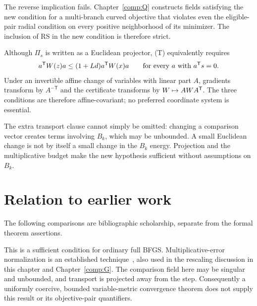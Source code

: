 The reverse implication fails. Chapter~\ref{comp:Q} constructs fields satisfying the new condition for a multi-branch curved objective that violates even the eligible-pair radial condition on every positive neighborhood of its minimizer. The inclusion of RS in the new condition is therefore strict.

Although $\Pi_s$ is written as a Euclidean projector, (T) equivalently requires
\[
 a^{\mathsf T} W(z)a\le(1+Ld)a^{\mathsf T} W(x)a\qquad\text{for every }a\text{ with }a^{\mathsf T} s=0.
\]
Under an invertible affine change of variables with linear part $A$, gradients transform by $A^{-\mathsf T}$ and the certificate transforms by $W\mapsto AWA^{\mathsf T}$. The three conditions are therefore affine-covariant; no preferred coordinate system is essential.

The extra transport clause cannot simply be omitted: changing a comparison vector creates terms involving $B_k$, which may be unbounded. A small Euclidean change is not by itself a small change in the $B_k$ energy. Projection and the multiplicative budget make the new hypothesis sufficient without assumptions on $B_k$.


\endgroup


\section*{Relation to earlier work}
The following comparisons are bibliographic scholarship, separate from the formal theorem assertions.

This is a sufficient condition for ordinary full BFGS. Multiplicative-error normalization is an established technique~\cite[Lemmas 2.2--2.3]{FND_CV13}, also used in the rescaling discussion in this chapter and Chapter~\ref{comp:G}. The comparison field here may be singular and unbounded, and transport is projected away from the step. Consequently a uniformly coercive, bounded variable-metric convergence theorem does not supply this result or its objective-pair quantifiers.
